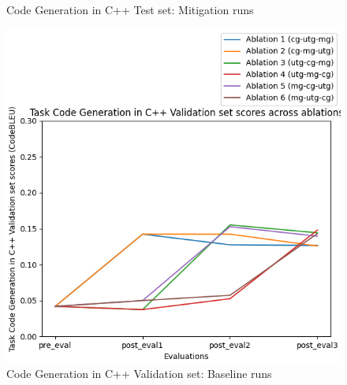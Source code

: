 \begin{figure}[H]
\begin{minipage}{0.45\textwidth}
        \captionsetup{width=1.1\textwidth}
        \caption{Code Generation in C++ Test set: Mitigation runs}
        \label{CGTestMitigation}
    \end{minipage}
\end{figure}

\begin{figure}[H]
    \centering
    \begin{minipage}{0.45\textwidth}
        \centering
        \includegraphics[width=1.1\textwidth]{Figures/results/code_baseline_graphs/task_eval/seed_averaged_task_cg_val_eval_baseline.png} %
        \captionsetup{width=1.1\textwidth}
        \caption{Code Generation in C++ Validation set: Baseline runs}
        \label{CGValBaseline}
    \end{minipage}\hfill
    \begin{minipage}{0.45\textwidth}
        \centering

\end{minipage}
\end{figure}
